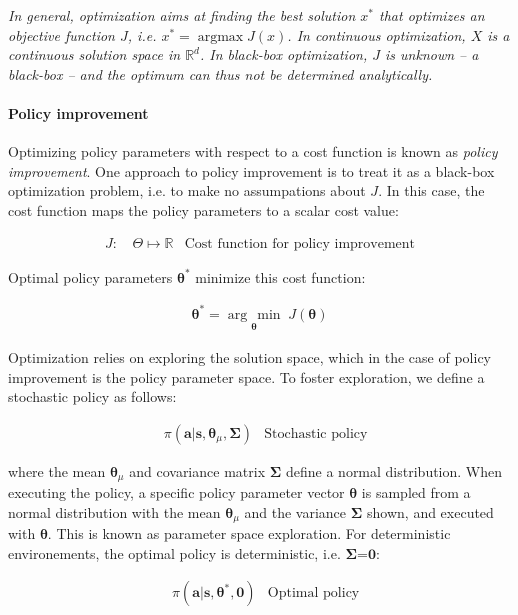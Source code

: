 \documentclass[12pt]{article}
\newcommand{\extract}[1]{{\em #1}}
\newcommand{\mymath}[1]{\ensuremath{#1}\xspace}
\newcommand{\act}    {\mymath{\mathbf{a}}}
\newcommand{\sta}    {\mymath{\mathbf{s}}}
\newcommand{\app}    {\mymath{\bm{\theta}}}
\newcommand{\appsp}  {\mymath{\Theta}}
\newcommand{\costf}  {\mymath{J}}
\newcommand{\covar}  {\mymath{\bm{\Sigma}}}
\newcommand{\argmin}[1]{\underset{#1}{\operatorname{arg}\,\operatorname{min}}\;}
\begin{document}
\extract{In general, \emph{optimization} aims at finding the best solution $x^*$ that optimizes an objective function $J$, i.e. $x^* = \operatorname{argmax}  J(x)$. In \emph{continuous} optimization, $X$ is a continuous solution space in $\mathbb{R}^d$. In \emph{black-box} optimization, $J$ is unknown -- a black-box -- and the optimum can thus not be determined analytically.}

\paragraph{Policy improvement} Optimizing policy parameters with respect to a cost function is known as \emph{policy improvement}. One approach to policy improvement is to treat it as a black-box optimization problem, i.e. to make no assumpations about $J$. In this case, the cost function maps the policy parameters to a scalar cost value:

\begin{align}
\costf\mbox{: } & \appsp \mapsto \mathbb{R}&\mbox{Cost function for policy improvement}\label{eq:cost}
\end{align}

Optimal policy parameters $\app^*$ minimize this cost function:

\begin{align}
\app^* = \argmin{\app}\costf(\app)
\end{align}

Optimization relies on exploring the solution space, which in the case of policy improvement is the policy parameter space. To foster exploration, we define a stochastic policy as follows:

\begin{align}
& \pi(\act|\sta,\app_\mu,\covar) & \mbox{Stochastic policy} \label{eq:stoch}
\end{align}

where the mean $\app_\mu$ and covariance matrix \covar  define a normal distribution. When executing the policy, a specific policy parameter vector \app is sampled from a normal distribution with the mean $\app_\mu$ and the variance $\covar$ shown, and executed with \app. This is known as parameter space exploration. For deterministic environements, the optimal policy is deterministic, i.e. \covar=$\mathbf{0}$:

\begin{align}
& \pi(\act|\sta,\app^*,\mathbf{0}) & \mbox{Optimal policy} \label{eq:stoch_opt}
\end{align}
\end{document}
